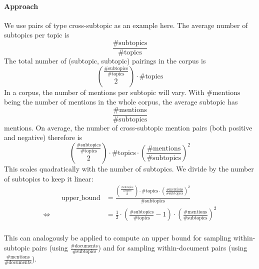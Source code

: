 \documentclass[a4paper]{article}
\begin{document}
\paragraph{Approach}
We use pairs of type cross-subtopic as an example here.
The average number of subtopics per topic is
\[\frac{\text{\#subtopics}}{\text{\#topics}}\]
The total number of (subtopic, subtopic) pairings in the corpus is
\[{\frac{\text{\#subtopics}}{\text{\#topics}}\choose 2} \cdot \text{\#topics}\]
In a corpus, the number of mentions per subtopic will vary. With $\text{\#mentions}$ being the number of mentions in the whole corpus, the average subtopic has \[\frac{\text{\#mentions}}{\text{\#subtopics}}\] mentions.
On average, the number of cross-subtopic mention pairs (both positive and negative) therefore is \[{\frac{\text{\#subtopics}}{\text{\#topics}}\choose 2} \cdot \text{\#topics} \cdot \left(\frac{\text{\#mentions}}{\text{\#subtopics}}\right)^2\]
This scales quadratically with the number of subtopics. We divide by the number of subtopics to keep it linear:
\begin{align*}
&& \text{upper\_bound} &= \frac{{\frac{\text{\#subtopics}}{\text{\#topics}}\choose 2} \cdot \text{\#topics} \cdot \left(\frac{\text{\#mentions}}{\text{\#subtopics}}\right)^2}{\text{\#subtopics}} \\
\Longleftrightarrow && &= \frac{1}{2} \cdot \left(\frac{\text{\#subtopics}}{\text{\#topics}} - 1\right) \cdot \left(\frac{\text{\#mentions}}{\text{\#subtopics}}\right)^2 \\
\end{align*}

This can analogously be applied to compute an upper bound for sampling within-subtopic pairs (using $\frac{\text{\#documents}}{\text{\#subtopics}}$) and for sampling within-document pairs (using $\frac{\text{\#mentions}}{\text{\#documents}}$).
	
\end{document}

